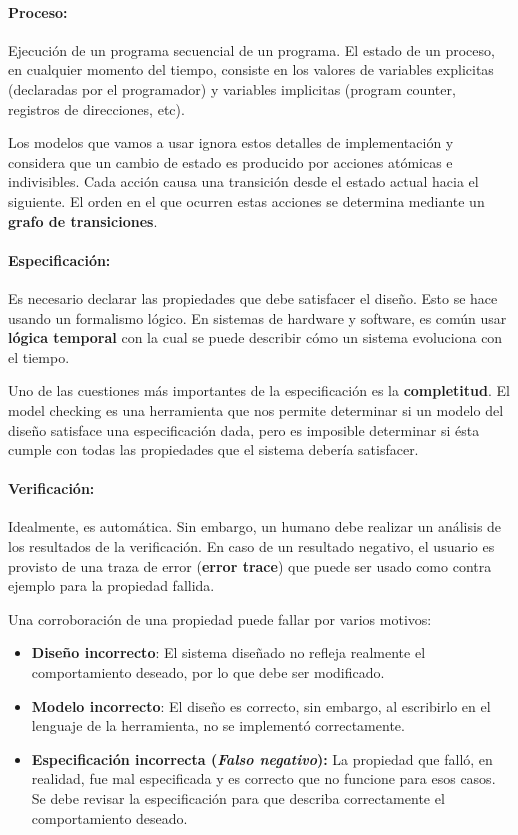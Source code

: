 \paragraph{Proceso:} Ejecución de un programa secuencial de un programa. El estado de un proceso, en cualquier momento del tiempo, consiste en los valores de variables explicitas (declaradas por el programador) y variables implicitas (program counter, registros de direcciones, etc). 

Los modelos que vamos a usar ignora estos detalles de implementación y considera que un cambio de estado es producido por acciones  atómicas e indivisibles. Cada acción causa una transición desde el estado actual hacia el siguiente. El orden en el que ocurren estas acciones se determina mediante un \textbf{grafo de transiciones}.

\paragraph{Especificación:} Es necesario declarar las propiedades que debe satisfacer el diseño. Esto se hace usando un formalismo lógico. En sistemas de hardware y software, es común usar \textbf{lógica temporal} con la cual se puede describir cómo un sistema evoluciona con el tiempo.

Uno de las cuestiones más importantes de la especificación es la \textbf{completitud}. El model checking es una herramienta que nos permite determinar si un modelo del diseño satisface una especificación dada, pero es imposible determinar si ésta cumple con todas las propiedades que el sistema debería satisfacer.

\paragraph{Verificación:} Idealmente, es automática. Sin embargo, un humano debe realizar un análisis de los resultados de la verificación. En caso de un resultado negativo, el usuario es provisto de una traza de error (\textbf{error trace}) que puede ser usado como contra ejemplo para la propiedad fallida. 

Una corroboración de una propiedad puede fallar por varios motivos: 
\begin{itemize}
\item \textbf{Diseño incorrecto}: El sistema diseñado no refleja realmente el comportamiento deseado, por lo que debe ser modificado.
\item \textbf{Modelo incorrecto}: El diseño es correcto, sin embargo, al escribirlo en el lenguaje de la herramienta, no se implementó correctamente.
\item \textbf{Especificación incorrecta (\textit{Falso negativo}):} La propiedad que falló, en realidad, fue mal especificada y es correcto que no funcione para esos casos. Se debe revisar la especificación para que describa correctamente el comportamiento deseado.
\end{itemize}

